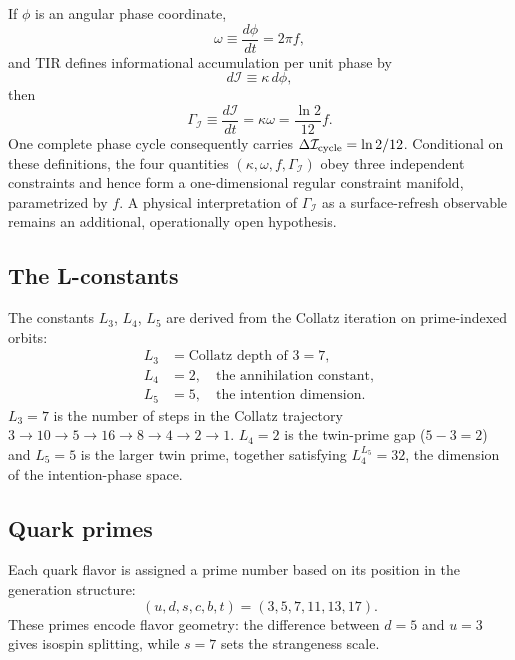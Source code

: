 \documentclass[aps,prd,reprint,twocolumn,showpacs,superscriptaddress]{revtex4-2}
\begin{document}
If $\phi$ is an angular phase coordinate,
\begin{equation}
\omega\equiv\frac{d\phi}{dt}=2\pi f,
\end{equation}
and TIR defines informational accumulation per unit phase by
\begin{equation}
d\mathcal I\equiv\kappa\,d\phi,
\end{equation}
then
\begin{equation}
\boxed{
\Gamma_{\mathcal I}
\equiv\frac{d\mathcal I}{dt}
=\kappa\omega
=\frac{\ln2}{12}f
}.
\label{eq:kappa_phase_rate_paper}
\end{equation}
One complete phase cycle consequently carries
$\Delta\mathcal I_{\rm cycle}=\ln2/12$.  Conditional on these definitions, the
four quantities $(\kappa,\omega,f,\Gamma_{\mathcal I})$ obey three independent
constraints and hence form a one-dimensional regular constraint manifold,
parametrized by $f$.  A physical interpretation of
$\Gamma_{\mathcal I}$ as a surface-refresh observable remains an additional,
operationally open hypothesis.

\subsection{The L-constants}

The constants $L_3$, $L_4$, $L_5$ are derived from the Collatz
iteration on prime-indexed orbits:
\begin{align}
L_3 &= \text{Collatz depth of 3} = 7, \\
L_4 &= 2,\quad \text{the annihilation constant},\\
L_5 &= 5,\quad \text{the intention dimension}.
\end{align}
$L_3 = 7$ is the number of steps in the Collatz trajectory $3 \to 10 \to
5 \to 16 \to 8 \to 4 \to 2 \to 1$.  $L_4 = 2$ is the twin-prime gap
($5 - 3 = 2$) and $L_5 = 5$ is the larger twin prime, together satisfying
$L_4^{L_5} = 32$, the dimension of the intention-phase space.

\subsection{Quark primes}

Each quark flavor is assigned a prime number based on its position in the
generation structure:
\begin{equation}
(u,d,s,c,b,t) = (3,5,7,11,13,17).
\end{equation}
These primes encode flavor geometry: the difference between
$d = 5$ and $u = 3$ gives isospin splitting, while $s = 7$ sets the
strangeness scale.
\end{document}
